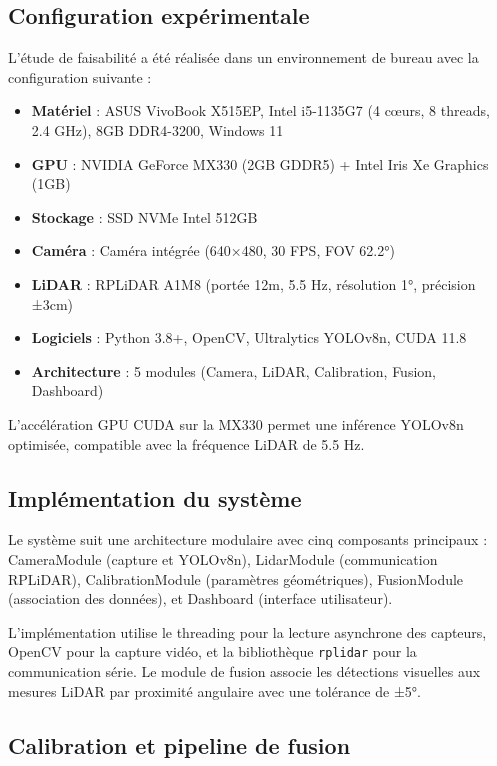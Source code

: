 \subsection{Configuration expérimentale}
\label{sec:configuration_experimentale}

L'étude de faisabilité a été réalisée dans un environnement de bureau avec la configuration suivante :

\begin{itemize}
    \item \textbf{Matériel} : ASUS VivoBook X515EP, Intel i5-1135G7 (4 cœurs, 8 threads, 2.4 GHz), 8GB DDR4-3200, Windows 11
    \item \textbf{GPU} : NVIDIA GeForce MX330 (2GB GDDR5) + Intel Iris Xe Graphics (1GB)
    \item \textbf{Stockage} : SSD NVMe Intel 512GB
    \item \textbf{Caméra} : Caméra intégrée (640×480, 30 FPS, FOV 62.2°)
    \item \textbf{LiDAR} : RPLiDAR A1M8 (portée 12m, 5.5 Hz, résolution 1°, précision ±3cm)
    \item \textbf{Logiciels} : Python 3.8+, OpenCV, Ultralytics YOLOv8n, CUDA 11.8
    \item \textbf{Architecture} : 5 modules (Camera, LiDAR, Calibration, Fusion, Dashboard)
\end{itemize}

L'accélération GPU CUDA sur la MX330 permet une inférence YOLOv8n optimisée, compatible avec la fréquence LiDAR de 5.5 Hz.

\subsection{Implémentation du système}
\label{sec:implementation}

Le système suit une architecture modulaire avec cinq composants principaux : CameraModule (capture et YOLOv8n), LidarModule (communication RPLiDAR), CalibrationModule (paramètres géométriques), FusionModule (association des données), et Dashboard (interface utilisateur).

L'implémentation utilise le threading pour la lecture asynchrone des capteurs, OpenCV pour la capture vidéo, et la bibliothèque \texttt{rplidar} pour la communication série. Le module de fusion associe les détections visuelles aux mesures LiDAR par proximité angulaire avec une tolérance de ±5°.

\subsection{Calibration et pipeline de fusion}
\label{sec:calibration_fusion}

